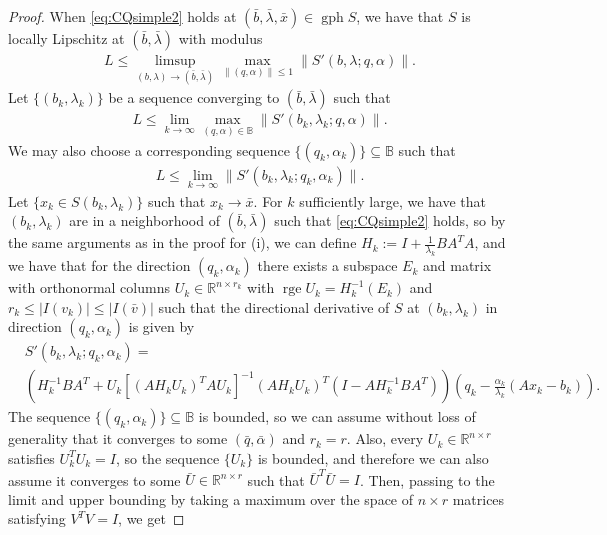 \documentclass[reqno]{amsart}
\numberwithin{equation}{section}
\newcommand{\B}{\mathbb{B}}
\newcommand{\R}{\mathbb{R}}
\newcommand{\x}{\bar{x}}
\newcommand{\gph}{\operatorname{gph}}
\newcommand{\rge}{\operatorname{rge}}
\begin{document}
\begin{proof}
 When \eqref{eq:CQsimple2} holds at $(\bar{b}, \bar{\lambda}, \bar{x}) \in \gph S$, we have that $S$ is locally Lipschitz 
 at $(\bar{b}, \bar{\lambda})$ with modulus \begin{align*}
    L \le \limsup_{(b, \lambda) \to (\bar{b}, \bar{\lambda})} \max_{\lVert (q, \alpha) \rVert \le 1} \lVert S'(b, \lambda ; q, \alpha) \rVert.
 \end{align*}
 Let $\{(b_k, \lambda_k)\}$ be a sequence converging to $(\bar b, \bar \lambda)$ such that 
 \begin{align*}
     L \le \lim_{k \to \infty} \max_{(q, \alpha) \in \B} \lVert S'(b_k, \lambda_k ; q, \alpha) \rVert. 
 \end{align*} We may also choose a corresponding sequence $\{(q_k, \alpha_k)\} \subseteq \B$ such that \begin{align*}
     L \le \lim_{k \to \infty} \lVert S'(b_k, \lambda_k ; q_k, \alpha_k) \rVert.
 \end{align*} 
 Let $\{x_k \in S(b_k, \lambda_k)\}$ such that $x_k \to \x$. For $k$ sufficiently large, we have that $(b_k, \lambda_k)$ are in a neighborhood of $(\bar b, \bar \lambda)$ such that \eqref{eq:CQsimple2} holds, so by the same arguments as in the proof for (i),  we can define $H_k := I + \frac{1}{\lambda_k}BA^TA$, and we have that for the direction $(q_k, \alpha_k)$ there exists a subspace $E_k$ and matrix with orthonormal columns $U_k\in \R^{n\times r_k}$ with $\rge U_k = H_k^{-1}(E_k)$ and $r_k\le|I(v_k)|\le |I(\bar v)|$ such that the directional derivative of $S$ at $(b_k, \lambda_k)$ in direction $(q_k, \alpha_k)$ is given by
 \begin{align*}
     &S'(b_k, \lambda_k ; q_k, \alpha_k) = \\
     &(H_k^{-1}BA^T + U_k[(AH_kU_k)^T AU_k]^{-1}(AH_kU_k)^T (I - AH_k^{-1}BA^T))(q_k - \frac{\alpha_k}{\lambda_k}(Ax_k - b_k)).
 \end{align*} 
 The sequence $\{(q_k, \alpha_k)\} \subseteq \B$ is bounded, so we can assume without loss of generality that it converges to some $(\bar q, \bar \alpha)$ and $r_k=r$.
 Also,  every $U_k\in \R^{n\times r}$ satisfies $U_k^TU_k = I$, so the sequence $\{U_k\}$ is bounded, and therefore we can also assume it converges to some $\bar U\in \R^{n\times r}$ such that $\bar U^T \bar U = I$. Then, passing to the limit and upper bounding by taking a maximum over the space of $n \times r$ matrices satisfying $V^TV = I$, we get

\end{proof}
\end{document}
